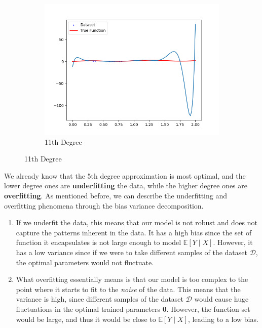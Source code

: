 \documentclass{article}
\theoremstyle{definition}
\theoremstyle{remark}
\theoremstyle{definition}
\begin{document}
\begin{figure}[hbt!]
\begin{subfigure}[b]{0.32\textwidth}
        \includegraphics[width=\textwidth]{polynomial_first/poly_11_fit.png}
        \caption{11th Degree}
        \label{fig:11e}
    \end{subfigure}
\end{figure}

We already know that the 5th degree approximation is most optimal, and the lower degree ones are \textbf{underfitting} the data, while the higher degree ones are \textbf{overfitting}. As mentioned before, we can describe the underfitting and overfitting phenomena through the bias variance decomposition. 
\begin{enumerate}
    \item If we underfit the data, this means that our model is not robust and does not capture the patterns inherent in the data. It has a high bias since the set of function it encapsulates is not large enough to model $\mathbb{E}[Y\mid X]$. However, it has a low variance since if we were to take different samples of the dataset $\mathcal{D}$, the optimal parameters would not fluctuate. 

    \item What overfitting essentially means is that our model is too complex to the point where it starts to fit to the \textit{noise} of the data. This means that the variance is high, since different samples of the dataset $\mathcal{D}$ would cause huge fluctuations in the optimal trained parameters $\boldsymbol{\theta}$. However, the function set would be large, and thus it would be close to $\mathbb{E}[Y \mid X]$, leading to a low bias. 
\end{enumerate}
\end{document}
